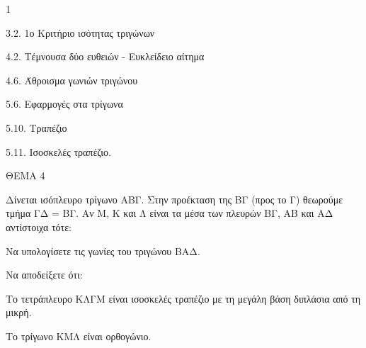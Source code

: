 \begin{ylh}{1}
    \item 3.2. 1ο Κριτήριο ισότητας τριγώνων
    \item 4.2. Τέμνουσα δύο ευθειών - Ευκλείδειο αίτημα
    \item 4.6. Άθροισμα γωνιών τριγώνου
    \item 5.6. Εφαρμογές στα τρίγωνα
    \item 5.10. Τραπέζιο
    \item 5.11. Ισοσκελές τραπέζιο.
\end{ylh}

ΘΕΜΑ 4

Δίνεται ισόπλευρο τρίγωνο ΑΒΓ. Στην προέκταση της ΒΓ (προς το Γ) θεωρούμε τμήμα ΓΔ = ΒΓ. Αν Μ, Κ και Λ είναι τα μέσα των πλευρών ΒΓ, ΑΒ και ΑΔ αντίστοιχα τότε:

\begin{alist}
\item Να υπολογίσετε τις γωνίες του τριγώνου ΒΑΔ. 

\item Να αποδείξετε ότι:

\begin{alist}
\item
  Το τετράπλευρο ΚΛΓΜ είναι ισοσκελές τραπέζιο με τη μεγάλη βάση διπλάσια από τη μικρή. 
\item
  Το τρίγωνο ΚΜΛ είναι ορθογώνιο. 


\begin{center}
\end{center}
\end{alist}
\end{alist}
